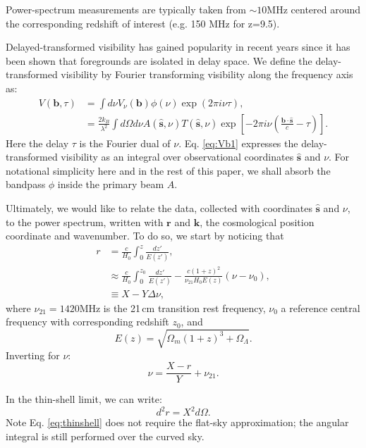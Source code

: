 \documentclass[twocolumn,apj,numberedappendix]{emulateapj}
\renewcommand\[{\begin{equation}}
\renewcommand\]{\end{equation}}
\begin{document}
Power-spectrum measurements are typically taken from $\sim10$MHz centered around the corresponding redshift of interest (e.g. 150 MHz for z=9.5). 

Delayed-transformed visibility has gained popularity in recent years since it has been shown that foregrounds are isolated in delay space. We define the delay-transformed visibility by Fourier transforming visibility along the frequency axis \citep{delay-transform} as:
\small
\begin{equation}
\begin{aligned}V(\boldsymbol{b},\tau) & =\int d\nu V_{\nu}(\boldsymbol{b})\phi(\nu)\exp\left(2\pi i\nu\tau\right),\\
 & =\frac{2k_{B}}{\lambda^{2}}\int d\Omega d\nu A(\hat{\boldsymbol{s}},\nu)T(\hat{\boldsymbol{s}},\nu)\exp\left[-2\pi i\nu\left(\frac{\boldsymbol{b}\cdot\hat{\boldsymbol{s}}}{c}-\tau\right)\right]. 
\end{aligned}
\label{eq:Vb1}
\end{equation}
\normalsize
Here the delay $\tau$ is the Fourier dual of $\nu$. Eq. \eqref{eq:Vb1} expresses the delay-transformed visibility as
an integral over observational coordinates $\hat{\boldsymbol{s}}$ and $\nu$. For notational simplicity here and in the rest of this paper, we shall absorb the bandpass $\phi$ inside the primary beam $A$.  

Ultimately,
we would like to relate the data, collected with coordinates $\hat{\boldsymbol{s}}$
and $\nu$, to the power spectrum, written with 
$\boldsymbol{r}$ and $\boldsymbol{k}$, the cosmological position coordinate and wavenumber. To do so, we start by noticing that
\[
\begin{aligned}r & =\frac{c}{H_{0}}\int_{0}^{z}\frac{dz'}{E(z')},\\
 & \approx\frac{c}{H_{0}}\int_{0}^{z_{0}}\frac{dz'}{E(z')}-\frac{c(1+z)^{2}}{\nu_{21}H_{0}E(z)}\left(\nu-\nu_{0}\right),\\
 & \equiv X-Y\Delta\nu,
\end{aligned} \label{eq:r}
\]
where $\nu_{21}=1420$MHz is the 21\,cm transition rest frequency, $\nu_{0}$
a reference central frequency with corresponding redshift $z_{0}$,
and 
\[
E(z)=\sqrt{\Omega_{m}(1+z)^{3}+\Omega_{\Lambda}}.
\]
Inverting for $\nu$:
\begin{equation}
\nu=\frac{X-r}{Y}+\nu_{21}.\label{eq:nur}
\end{equation}

In the thin-shell limit, we can write:
\begin{equation}
d^2r=X^2d\Omega. 
\label{eq:thinshell}
\end{equation}
Note Eq. \eqref{eq:thinshell} does not require the flat-sky approximation; the angular integral is still performed over the curved sky. 
\end{document}
